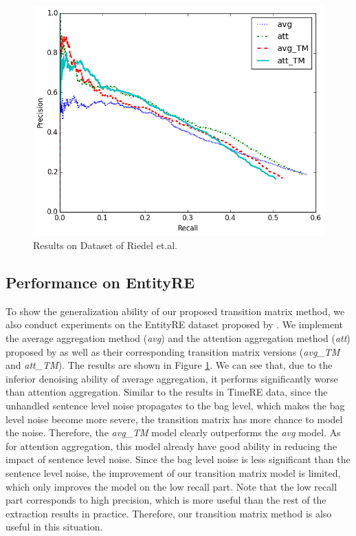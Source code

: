 \begin{figure}[htbp]
\includegraphics[width=0.9\linewidth]{figures/re_att_avg_cmp_exp.png}
\caption{Results on Dataset of Riedel et.al.} 
\label{fig: Riedel_res}
\end{figure}

\subsection{Performance on EntityRE}
To show the generalization ability of our proposed transition matrix method, we also conduct experiments on the EntityRE dataset proposed by \cite{riedel2010modeling}. We implement the average aggregation method (\emph{avg}) and the attention aggregation method (\emph{att}) proposed by \cite{lin2016neural} as well as their corresponding transition matrix versions (\emph{avg\_TM} and \emph{att\_TM}). The results are shown in Figure \ref{fig: Riedel_res}. We can see that, due to the inferior denoising ability of average aggregation, it performs significantly worse than attention aggregation. Similar to the results in TimeRE data, since the unhandled sentence level noise propagates to the bag level, which makes the bag level noise become more severe, the transition matrix has more chance to model the noise. Therefore, the \emph{avg\_TM} model clearly outperforms the \emph{avg} model. As for attention aggregation, this model already have good ability in reducing the impact of sentence level noise. Since the bag level noise is less significant than the sentence level noise, the improvement of our transition matrix model is limited, which only improves the model on the low recall part. Note that the low recall part corresponds to high precision, which is more useful than the rest of the extraction results in practice. Therefore, our transition matrix method is also useful in this situation.

